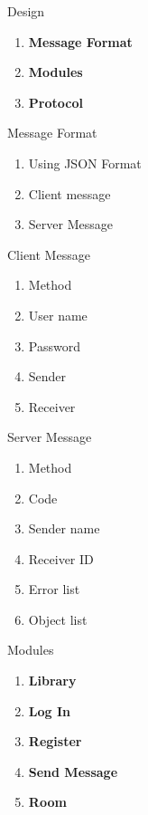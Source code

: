 \documentclass{beamer}
\begin{document}
\begin{frame}{Design}
\begin{enumerate}
\item \textbf{Message Format}
\item \textbf{Modules}
\item \textbf{Protocol}
\end{enumerate}
\end{frame}



\begin{frame}{Message Format}
\begin{enumerate}
\item Using JSON Format
\item Client message
\item Server Message
\end{enumerate}
\end{frame}


\begin{frame}{Client Message}
\begin{enumerate}
\item Method 
\item User name
\item Password
\item Sender
\item Receiver
\end{enumerate}

\end{frame}

\begin{frame}{Server Message}
\begin{enumerate}
\item Method
\item Code
\item Sender name
\item Receiver ID
\item Error list
\item Object list
\end{enumerate}

\end{frame}


\begin{frame}{Modules}
\begin{enumerate}
\item \textbf{Library}
\item \textbf{Log In}
\item \textbf{Register}
\item \textbf{Send Message}
\item \textbf{Room}
\end{enumerate}
\end{frame}
\end{document}
